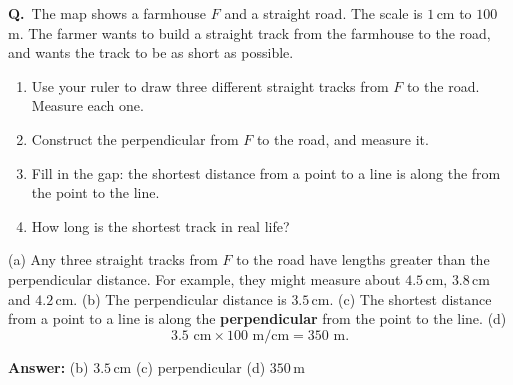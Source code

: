 \documentclass[12pt,a4paper]{article}
\newcounter{sol}
\newcommand{\s}{\refstepcounter{sol}\textbf{Q\thesol.}\ }
\newcommand{\ans}[1]{\par\smallskip\noindent\textbf{Answer:} #1\par}
\newcommand{\pt}[3]{\fill #1 circle (1.5pt); \node[inner sep=2pt,#2] at #1 {$#3$};}
\begin{document}
\begin{center}
\end{center}

\s The map shows a farmhouse \(F\) and a straight road. The scale is \(1\)\,cm to \(100\)\,m. The farmer wants to build a straight track from the farmhouse to the road, and wants the track to be as short as possible.
\begin{enumerate}
  \item Use your ruler to draw three different straight tracks from \(F\) to the road. Measure each one.
  \item Construct the perpendicular from \(F\) to the road, and measure it.
  \item Fill in the gap: the shortest distance from a point to a line is along the \underline{\hspace{3.4cm}} from the point to the line.
  \item How long is the shortest track in real life?
\end{enumerate}

\begin{solbox}
(a) Any three straight tracks from \(F\) to the road have lengths greater than the perpendicular distance. For example, they might measure about \(4.5\)\,cm, \(3.8\)\,cm and \(4.2\)\,cm. (b) The perpendicular distance is \(3.5\)\,cm. (c) The shortest distance from a point to a line is along the \textbf{perpendicular} from the point to the line. (d)
\[
3.5\text{ cm}\times 100\text{ m/cm}=350\text{ m}.
\]
\end{solbox}
\ans{(b) \(3.5\)\,cm \qquad (c) perpendicular \qquad (d) \(350\)\,m}

\begin{center}
\end{center}
\end{document}
